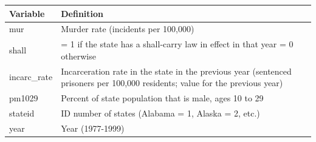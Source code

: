 \documentclass[]{article}
\theoremstyle{definition}
\theoremstyle{definition}
\theoremstyle{remark}
\begin{document}
\begin{longtable}[c]{@{}ll@{}}
\toprule
\begin{minipage}[b]{0.17\columnwidth}\raggedright\strut
Variable
\strut\end{minipage} &
\begin{minipage}[b]{0.74\columnwidth}\raggedright\strut
Definition
\strut\end{minipage}\tabularnewline
\midrule
\endhead
\begin{minipage}[t]{0.17\columnwidth}\raggedright\strut
mur
\strut\end{minipage} &
\begin{minipage}[t]{0.74\columnwidth}\raggedright\strut
Murder rate (incidents per 100,000)
\strut\end{minipage}\tabularnewline
\begin{minipage}[t]{0.17\columnwidth}\raggedright\strut
shall
\strut\end{minipage} &
\begin{minipage}[t]{0.74\columnwidth}\raggedright\strut
= 1 if the state has a shall-carry law in effect in that year = 0
otherwise
\strut\end{minipage}\tabularnewline
\begin{minipage}[t]{0.17\columnwidth}\raggedright\strut
incarc\_rate
\strut\end{minipage} &
\begin{minipage}[t]{0.74\columnwidth}\raggedright\strut
Incarceration rate in the state in the previous year (sentenced
prisoners per 100,000 residents; value for the previous year)
\strut\end{minipage}\tabularnewline
\begin{minipage}[t]{0.17\columnwidth}\raggedright\strut
pm1029
\strut\end{minipage} &
\begin{minipage}[t]{0.74\columnwidth}\raggedright\strut
Percent of state population that is male, ages 10 to 29
\strut\end{minipage}\tabularnewline
\begin{minipage}[t]{0.17\columnwidth}\raggedright\strut
stateid
\strut\end{minipage} &
\begin{minipage}[t]{0.74\columnwidth}\raggedright\strut
ID number of states (Alabama = 1, Alaska = 2, etc.)
\strut\end{minipage}\tabularnewline
\begin{minipage}[t]{0.17\columnwidth}\raggedright\strut
year
\strut\end{minipage} &
\begin{minipage}[t]{0.74\columnwidth}\raggedright\strut
Year (1977-1999)
\strut\end{minipage}\tabularnewline
\bottomrule
\end{longtable}
\end{document}
